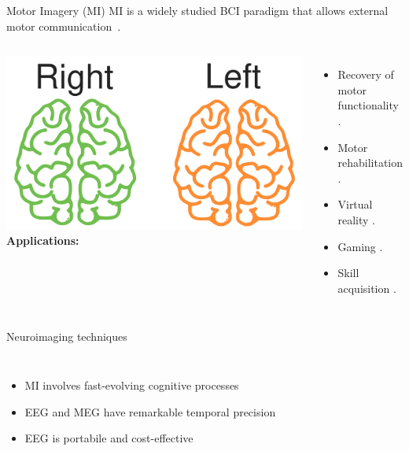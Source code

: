 \documentclass[aspectratio=169]{beamer}
\let\oldcite\cite %
\renewcommand{\cite}[1]{{\tiny\oldcite{#1}}}
\begin{document}
\begin{frame}{Motor Imagery (MI)}
    \centering
    MI is a widely studied BCI paradigm that allows external motor communication~\cite{cattan2018recommendations}.
    \vspace{3em}
    \begin{columns}
        \centering
        \includegraphics[width=0.7\linewidth]{figures/Motor_imagery.png}
            \textbf{Applications:}
            \begin{itemize}
                \item Recovery of motor functionality \cite{bonci2021introductory}.
                \item Motor rehabilitation \cite{sitaram2017closed}.
                \item Virtual reality  \cite{cattan2018recommendations}.
                \item Gaming \cite{ahn2014review}.
                \item Skill acquisition \cite{casimo2017bci}.
            \end{itemize}
    \end{columns}
\end{frame}

\begin{frame}{Neuroimaging techniques}
    \begin{columns}
            \begin{itemize}
                \item MI involves fast-evolving cognitive processes \cite{varbu2022past}
                \item EEG and MEG have remarkable temporal precision \cite{alsharif2020neuromarketing}
                \item EEG is portabile and cost-effective \cite{janapati2023advances, hosseini2020review}
            \end{itemize}
            \begin{figure}[h!]
                \centering
                \resizebox{1\linewidth}{!}{}
            \end{figure}
    \end{columns}
\end{frame}
\end{document}
